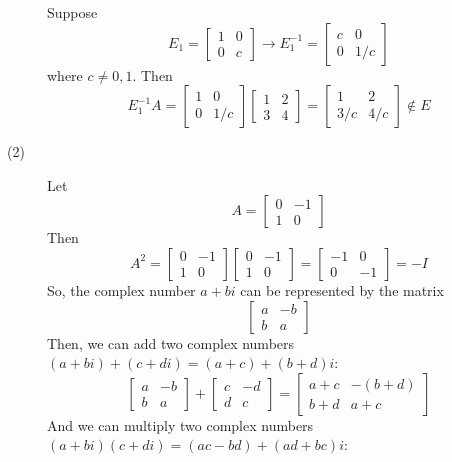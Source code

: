 \begin{description}
Suppose
$$E_1 = \begin{bmatrix}
1 & 0 \\
0 & c
\end{bmatrix} \rightarrow E_1^{-1} = \begin{bmatrix}
c & 0 \\
0 & 1/c
\end{bmatrix}$$
where $c \neq 0, 1$. Then
$$E_1^{-1}A = \begin{bmatrix}
1 & 0 \\
0 & 1/c
\end{bmatrix}\begin{bmatrix}
1 & 2 \\
3 & 4
\end{bmatrix} = \begin{bmatrix}
1 & 2 \\
3/c & 4/c
\end{bmatrix} \not \in E$$
\item[(2)]
Let
$$A = \begin{bmatrix}
0 & -1 \\
1 & 0
\end{bmatrix}$$
Then
$$A^2 = \begin{bmatrix}
0 & -1 \\
1 & 0
\end{bmatrix}\begin{bmatrix}
0 & -1 \\
1 & 0
\end{bmatrix} = \begin{bmatrix}
-1 & 0 \\
0 & -1
\end{bmatrix} = -I$$
So, the complex number $a + bi$ can be represented by the matrix
$$\begin{bmatrix}
a & -b \\
b & a
\end{bmatrix}$$
Then, we can add two complex numbers $(a + bi) + (c + di) = (a + c) + (b + d)i$:
$$\begin{bmatrix}
a & -b \\
b & a
\end{bmatrix} + \begin{bmatrix}
c & -d \\
d & c
\end{bmatrix} = \begin{bmatrix}
a + c & -(b + d) \\
b + d & a + c
\end{bmatrix}$$
And we can multiply two complex numbers $(a + bi)(c + di) = (ac - bd) + (ad + bc)i$:

\end{description}
